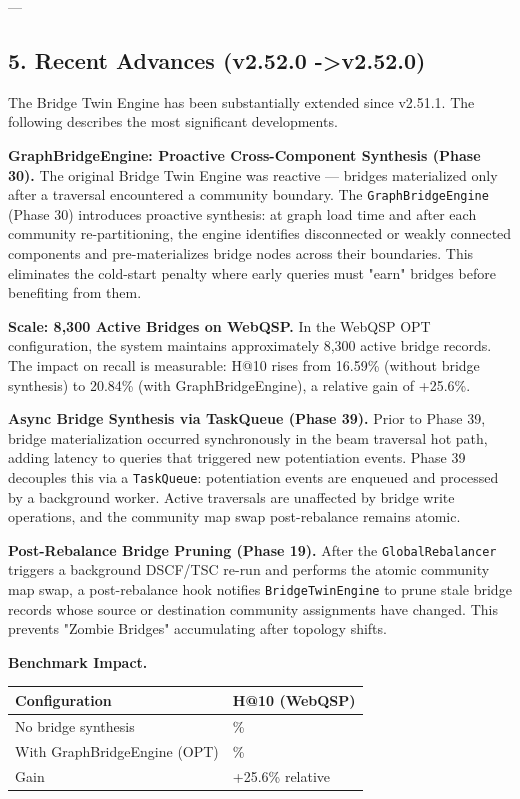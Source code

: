 ---

\subsection{5. Recent Advances (v2.52.0 -\textgreater  v2.52.0)}

The Bridge Twin Engine has been subst\-antially extended since v2.51.1. The following describes the most significant devel\-opments.

\textbf{GraphBridgeEngine: Proactive Cross-Component Synthesis (Phase 30).} The original Bridge Twin Engine was reactive — bridges mater\-ialized only after a traversal encountered a community boundary. The \texttt{GraphBridgeEngine} (Phase 30) introduces proactive synthesis: at graph load time and after each community re-parti\-tioning, the engine identifies disco\-nnected or weakly connected components and pre-mater\-ializes bridge nodes across their boundaries. This eliminates the cold-start penalty where early queries must "earn" bridges before benefiting from them.

\textbf{Scale: 8,300 Active Bridges on WebQSP.} In the WebQSP OPT confi\-guration, the system maintains appro\-ximately 8,300 active bridge records. The impact on recall is measurable: H@10 rises from 16.59\% (without bridge synthesis) to 20.84\% (with GraphBridgeEngine), a relative gain of +25.6\%.

\textbf{Async Bridge Synthesis via TaskQueue (Phase 39).} Prior to Phase 39, bridge mater\-ialization occurred synch\-ronously in the beam traversal hot path, adding latency to queries that triggered new poten\-tiation events. Phase 39 decouples this via a \texttt{TaskQueue}: poten\-tiation events are enqueued and processed by a background worker. Active traversals are unaffected by bridge write operations, and the community map swap post-rebalance remains atomic.

\textbf{Post-Rebalance Bridge Pruning (Phase 19).} After the \texttt{GlobalRebalancer} triggers a background DSCF/TSC re-run and performs the atomic community map swap, a post-rebalance hook notifies \texttt{BridgeTwinEngine} to prune stale bridge records whose source or destination community assignments have changed. This prevents "Zombie Bridges" accum\-ulating after topology shifts.

\textbf{Benchmark Impact.}

\begin{center}
\begin{tabularx}{\columnwidth}{|>{\raggedright\arraybackslash}X|>{\raggedright\arraybackslash}X|}
\hline
Config\-uration & H@10 (WebQSP) \\ \hline
No bridge synthesis & 16.59\% \\ \hline
With GraphBridgeEngine (OPT) & 20.84\% \\ \hline
Gain & +25.6\% relative \\ \hline
\end{tabularx}
\end{center}


